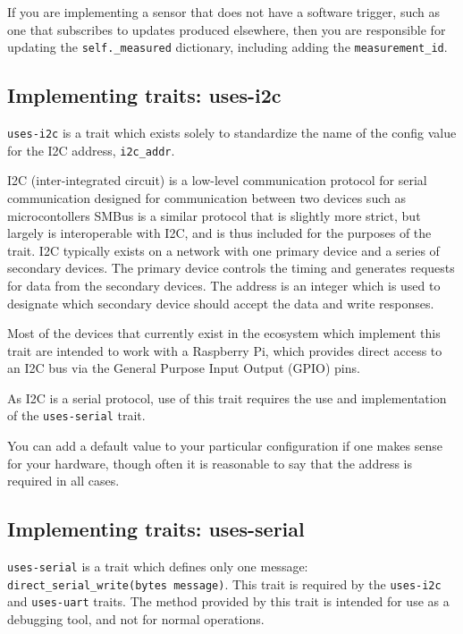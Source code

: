 If you are implementing a sensor that does not have a software trigger, such as one that subscribes to updates produced elsewhere, then you are responsible for updating the \texttt{self.\_measured} dictionary, including adding the \texttt{measurement\_id}.


\subsection{Implementing traits: uses-i2c}

\texttt{uses-i2c} is a trait which exists solely to standardize the name of the config value for the I2C address, \texttt{i2c\_addr}.

I2C (inter-integrated circuit) is a low-level communication protocol for serial communication designed for communication between two devices such as microcontollers\cite{}
SMBus\cite{} is a similar protocol that is slightly more strict, but largely is interoperable with I2C, and is thus included for the purposes of the \yaq{} trait.
I2C typically exists on a network with one primary device and a series of secondary devices.
The primary device controls the timing and generates requests for data from the secondary devices.
The address is an integer which is used to designate which secondary device should accept the data and write responses.

Most of the devices that currently exist in the \yaq{} ecosystem which implement this trait are intended to work with a Raspberry Pi, which provides direct access to an I2C bus via the General Purpose Input Output (GPIO) pins.

As I2C is a serial protocol, use of this trait requires the use and implementation of the \texttt{uses-serial} trait.

You can add a default value to your particular configuration if one makes sense for your hardware, though often it is reasonable to say that the address is required in all cases.

\subsection{Implementing traits: uses-serial}

\texttt{uses-serial} is a trait which defines only one message: \texttt{direct\_serial\_write(bytes message)}.
This trait is required by the \texttt{uses-i2c} and \texttt{uses-uart} traits.
The method provided by this trait is intended for use as a debugging tool, and not for normal operations.

